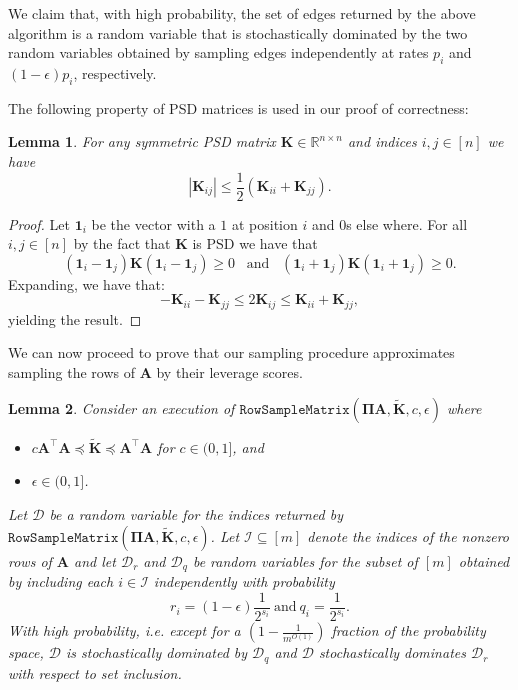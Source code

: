 \documentclass[11pt]{article}
\newcommand{\bv}[1]{\mathbf{#1}}
\newcommand{\sample}{\texttt{RowSampleMatrix}}
\newcommand{\R}{\mathbb{R}}
\newcommand{\mvar}[1]{\bv{#1}}
\newcommand{\ma}{\mvar{A}}
\newcommand{\mk}{\mvar{K}}
\newcommand{\dist}{\mathcal{D}}
\newtheorem{lemma}{Lemma}
\begin{document}
We claim that, with high probability, the set of edges returned by the above algorithm is a random variable that is stochastically dominated by the two random variables obtained by sampling edges independently at rates $p_i$ and $(1-\epsilon)p_i$, respectively.

The following property of PSD matrices is used in our proof of correctness:
\begin{lemma}
\label{lem:gen:psd_fact}
For any symmetric PSD matrix $\mk \in \R^{n \times n}$ and indices $i ,j \in [n]$ we have
\[
\left| \mk_{ij} \right| \leq \frac{1}{2} \left(\mk_{ii} + \mk_{jj}\right).
\]
\end{lemma}

\begin{proof}
Let $\bv{1}_i$ be the vector with a $1$ at position $i$ and $0$s else where. For all $i, j \in [n]$ by the fact that $\mk$ is PSD we have that
\[
\left(\bv{1}_i - \bv{1}_j\right) \mk \left(\bv{1}_i - \bv{1}_j\right)
\geq 0
\enspace \text{ and } \enspace
\left(\bv{1}_i + \bv{1}_j\right) \mk \left(\bv{1}_i + \bv{1}_j\right)
\geq 0.
\]
Expanding, we have that:
\[
-\mk_{ii} - \mk_{jj}
\leq 2 \mk_{ij}
\leq \mk_{ii} + \mk_{jj},
\]
yielding the result.
\end{proof}

We can now proceed to prove that our sampling procedure approximates sampling the rows of $\bv{A}$ by their leverage scores.
\begin{lemma}\label{matrix_dominance} Consider an execution of $\sample(\bv{\Pi} \ma, \tilde{\mk}, c, \epsilon)$ where
\begin{itemize}
  \item $c\ma^\top \ma \preceq \tilde{\mk} \preceq \ma^\top \ma$ for $c \in (0, 1]$, and
  \item $\epsilon \in (0, 1]$.
\end{itemize}
Let $\dist$ be a random variable for the indices returned by $\sample(\bv{\Pi} \ma, \tilde{\mk}, c, \epsilon)$. Let $\mathcal{I} \subseteq [m]$ denote the indices of the nonzero rows of $\ma$ and let $\dist_r$ and $\dist_q$ be random variables for the subset of $[m]$ obtained by including each $i \in \mathcal{I}$ independently with probability
\[
r_i = (1 - \epsilon) \frac{1}{2^{s_i}}
~ \text{and} ~
q_i = \frac{1}{2^{s_i}} .
\]
With high probability, i.e. except for a $(1-\frac{1}{m^{O(1)}})$ fraction of the probability space, $\dist$ is stochastically dominated by $\dist_q$ and $\dist$ stochastically dominates $\dist_r$ with respect to set inclusion.
\end{lemma}
\end{document}
